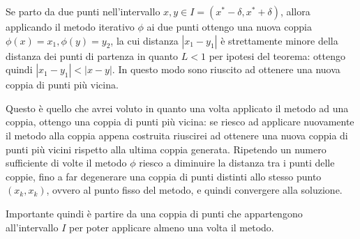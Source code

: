\begin{oss}
Se parto da due punti nell'intervallo $x, y \in I = (x^{*} - \delta, x^{*} +
\delta)$, allora applicando il metodo iterativo $\phi$ ai due punti ottengo una
nuova coppia $\phi(x) = x_{1}, \phi(y) = y_{2}$, la cui distanza $|x_{1} - y_{1}|$
\`e strettamente minore della distanza dei punti di partenza in quanto $L < 1$
per ipotesi del teorema: ottengo quindi $|x_{1} - y_{1}| < |x - y|$. In questo
modo sono riuscito ad ottenere una nuova coppia di punti pi\`u vicina.

Questo \`e quello che avrei voluto in quanto una volta applicato il metodo ad
una coppia, ottengo una coppia di punti pi\`u vicina: se riesco ad applicare
nuovamente il metodo alla coppia appena costruita riuscirei ad ottenere una
nuova coppia di punti pi\`u vicini rispetto alla ultima coppia generata.
Ripetendo un numero sufficiente di volte il metodo $\phi$ riesco a diminuire la
distanza tra i punti delle coppie, fino a far degenerare una coppia di punti
distinti allo stesso punto $(x_{k}, x_{k})$, ovvero al punto fisso del metodo,
e quindi convergere alla soluzione.

Importante quindi \`e partire da una coppia di punti che appartengono
all'intervallo $I$ per poter applicare almeno una volta il metodo.


\end{oss}
